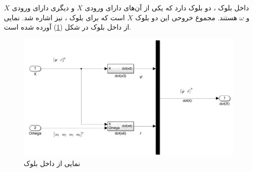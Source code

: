 داخل بلوک
،
دو بلوک دارد که یکی از آن‌های دارای ورودی $X$ و دیگری دارای ورودی $X$ و $\omega$ هستند. مجموع خروحی این دو بلوک $\dot X$ است که برای بلوک
،
نیز اشاره شد.
نمایی از داخل بلوک
در شکل (\ref{yaw_all-six}) آورده شده است.
\begin{figure}[H]
	\includegraphics[width=16cm]{../../Figures/QuadSimulation/yaw_all-six.png}
	\centering
	\caption{نمایی از داخل بلوک }
	\label{yaw_all-six}
\end{figure}